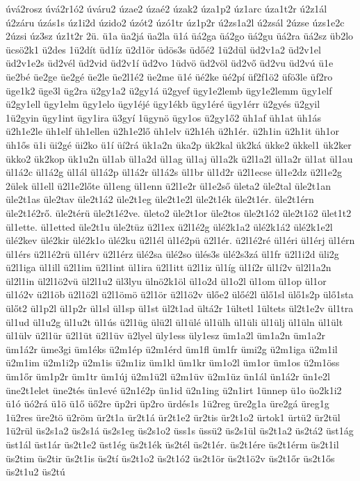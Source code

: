 {úvá2rosz
úvá2r1ó2
úváru2
úzae2
úzaé2
úzak2
úza1p2
úz1arc
úza1t2r
ú2z1ál
ú2záru
úzás1s
úz1i2d
úzido2
úzót2
úzó1tr
úz1p2r
ú2zs1a2l
ú2zsál
2úzse
úzs1e2c
2úzsi
úz3sz
úz1t2r
2ü.
ü1a
üa2já
üa2la
ü1á
üá2ga
üá2go
üá2gu
üá2ra
üá2sz
üb2lo
ücsö2k1
ü2des
1ü2dít
üd1íz
ü2d1ör
üdös3s
üdőé2
1ü2dül
üd2v1a2
üd2v1el
üd2v1e2s
üd2vél
üd2vid
üd2v1í
üd2vo
1üdvö
üd2völ
üd2vő
üd2vu
üd2vú
ü1e
üe2bé
üe2ge
üe2gé
üe2le
üe2l1é2
üe2me
ü1é
üé2ke
üé2pí
üf2f1ö2
üfö3le
üf2ro
üge1k2
üge3l
üg2ra
ü2gy1a2
ü2gy1á
ü2gyef
ügy1e2lemb
ügy1e2lemm
ügy1elf
ü2gy1ell
ügy1elm
ügy1elo
ügy1éjé
ügy1ékb
ügy1éré
ügy1érr
ü2gyés
ü2gyil
1ü2gyin
ügy1int
ügy1ira
ü3gyí
1ügynö
ügy1os
ü2gy1ő2
üh1af
üh1at
üh1ás
ü2h1e2le
üh1elf
üh1ellen
ü2h1e2lő
üh1elv
ü2h1éh
ü2h1ér.
ü2h1in
ü2h1it
üh1or
üh1ős
ü1i
üi2gé
üi2ko
ü1í
üí2rá
ük1a2n
üka2p
ük2kal
ük2ká
ükke2
ükkel1
ük2ker
ükko2
ük2kop
ük1u2n
ül1ab
ül1a2d
ül1ag
ül1aj
ül1a2k
ü2l1a2l
ül1a2r
ül1at
ül1au
ül1á2c
ül1á2g
ül1ál
ül1á2p
ül1á2r
ül1á2s
ül1br
ül1d2r
ü2l1ecse
ül1e2dz
ü2l1e2g
2ülek
ül1ell
ü2l1e2lőte
ül1eng
ül1enn
ü2l1e2r
ül1e2ső
ületa2
üle2tal
üle2t1an
üle2t1as
üle2tav
üle2t1á2
üle2t1eg
üle2t1e2l
üle2t1ék
üle2t1ér.
üle2t1érn
üle2t1é2rő.
üle2térü
üle2t1é2ve.
ületo2
üle2t1or
üle2tos
üle2t1ó2
üle2t1ö2
ület1t2
ül1ette.
ül1etted
üle2t1u
üle2tüz
ü2l1ex
ü2l1é2g
ülé2k1a2
ülé2k1á2
ülé2k1e2l
ülé2kev
ülé2kir
ülé2k1o
ülé2ku
ü2l1él
ül1é2pü
ü2l1ér.
ü2l1é2ré
ül1éri
ül1érj
ül1érn
ül1érs
ü2l1é2rü
ül1érv
ü2l1érz
ülé2sa
ülé2so
ülés3s
ülé2s3zá
ül1fr
ü2l1i2d
üli2g
ü2l1iga
ül1ill
ü2l1im
ü2l1int
ül1ira
ü2l1itt
ü2l1iz
ül1íg
ül1í2r
ül1í2v
ül2l1a2n
ül2l1in
ül2l1ö2vü
ül2l1u2
ül3lyu
ülnö2k1öl
ül1o2d
ül1o2l
ül1om
ül1op
ül1or
ül1ó2v
ü2l1öb
ü2l1ö2l
ü2l1ömö
ü2l1ör
ü2l1ö2v
ülőe2
ülőé2l
ülő1sl
ülő1s2p
ülő1sta
ülőt2
ül1p2l
ül1p2r
ül1sl
ül1sp
ül1st
ül2t1ad
ültá2r
1ültetl
1ültets
ül2t1e2v
ül1tra
ül1ud
ül1u2g
ül1u2t
ül1ús
ü2l1üg
ülü2l
ül1ülé
ül1ülh
ül1üli
ül1ülj
ül1üln
ül1ült
ül1ülv
ü2l1ür
ü2l1üt
ü2l1üv
ü2lyel
üly1ess
üly1esz
üm1a2l
üm1a2n
üm1a2r
üm1á2r
üme3gi
üm1éks
ü2m1ép
ü2m1érd
üm1fl
üm1fr
ümi2g
ü2m1iga
ü2m1il
ü2m1im
ü2m1i2p
ü2m1is
ü2m1iz
üm1kl
üm1kr
üm1o2l
üm1or
üm1os
ü2m1öss
üm1őr
üm1p2r
üm1tr
üm1új
ü2m1ü2l
ü2m1üv
ü2m1üz
ün1ál
ün1á2r
ün1e2l
üne2t1elet
üne2tés
ün1evé
ü2n1é2p
ün1id
ü2n1ing
ü2n1irt
1ünnep
ü1o
üo2k1i2
ü1ó
üó2rá
ü1ö
ü1ő
üő2re
üp2ri
üp2ro
ürdés1s
1ü2reg
üre2g1a
üre2gá
üreg1g
1ü2res
üre2tö
ü2röm
ür2t1a
ür2t1á
ür2t1e2
ür2tis
ür2t1o2
ürtok1
ürtü2
ür2tül
1ü2rül
üs2s1a2
üs2s1á
üs2s1eg
üs2s1o2
üss1s
üssü2
üs2s1ül
üs2t1a2
üs2tá2
üst1ág
üst1ál
üst1ár
üs2t1e2
üst1ég
üs2t1ék
üs2tél
üs2t1ér.
üs2t1ére
üs2t1érm
üs2t1il
üs2tim
üs2tir
üs2t1is
üs2tí
üs2t1o2
üs2t1ó2
üs2t1ör
üs2t1ö2v
üs2t1őr
üs2t1ős
üs2t1u2
üs2tú
}
